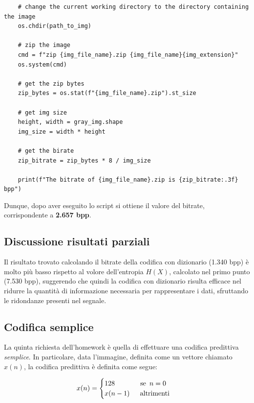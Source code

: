 \begin{lstlisting}
    # change the current working directory to the directory containing the image
    os.chdir(path_to_img)

    # zip the image
    cmd = f"zip {img_file_name}.zip {img_file_name}{img_extension}"
    os.system(cmd)
    
    # get the zip bytes
    zip_bytes = os.stat(f"{img_file_name}.zip").st_size

    # get img size
    height, width = gray_img.shape
    img_size = width * height

    # get the birate
    zip_bitrate = zip_bytes * 8 / img_size 

    print(f"The bitrate of {img_file_name}.zip is {zip_bitrate:.3f} bpp")
\end{lstlisting}

\noindent Dunque, dopo aver eseguito lo script si ottiene il valore del bitrate, corrispondente a \textbf{2.657 bpp}. 



\vspace{15px}\subsection{Discussione risultati parziali}
Il risultato trovato calcolando il bitrate della codifica con dizionario (1.340 bpp) è molto più basso rispetto al volore dell'entropia $H(X)$, calcolato nel primo punto (7.530 bpp), suggerendo che quindi la codifica con dizionario risulta efficace nel ridurre la quantità di informazione necessaria per rappresentare i dati, sfruttando le ridondanze presenti nel segnale.




\vspace{15px}\subsection{Codifica semplice}\label{simple-coding}
La quinta richiesta dell'homework è quella di effettuare una codifica predittiva \textsl{semplice}. In particolare, data l'immagine, definita come un vettore chiamato $x(n)$, la codifica predittiva è definita come segue:

\begin{gather*}
    x(n) = 
    \begin{cases}
        128 \hspace{37px} \text{se } \, n = 0 \\
        x(n - 1) \hspace{15px} \text{altrimenti}\\
    \end{cases}
\end{gather*}

